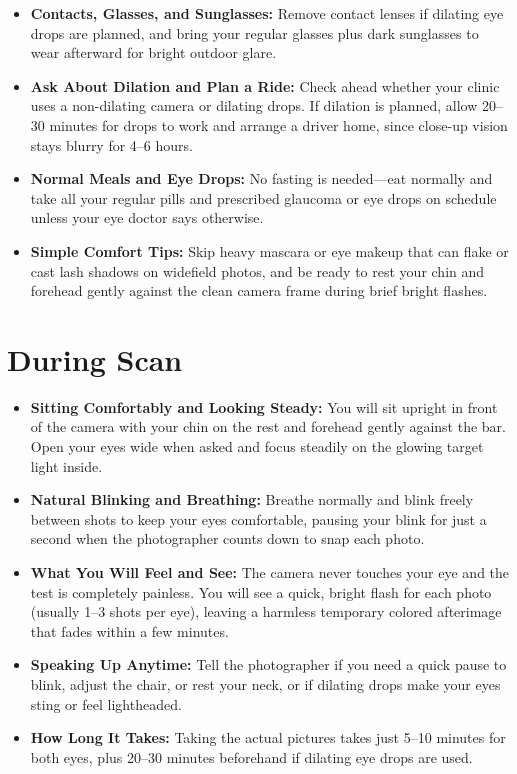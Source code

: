 \begin{itemize}
    \item \textbf{Contacts, Glasses, and Sunglasses:} Remove contact lenses if dilating eye drops are planned, and bring your regular glasses plus dark sunglasses to wear afterward for bright outdoor glare.
    \item \textbf{Ask About Dilation and Plan a Ride:} Check ahead whether your clinic uses a non-dilating camera or dilating drops. If dilation is planned, allow 20--30 minutes for drops to work and arrange a driver home, since close-up vision stays blurry for 4--6 hours.
    \item \textbf{Normal Meals and Eye Drops:} No fasting is needed---eat normally and take all your regular pills and prescribed glaucoma or eye drops on schedule unless your eye doctor says otherwise.
    \item \textbf{Simple Comfort Tips:} Skip heavy mascara or eye makeup that can flake or cast lash shadows on widefield photos, and be ready to rest your chin and forehead gently against the clean camera frame during brief bright flashes.
\end{itemize}

\section{During Scan}

\begin{itemize}
    \item \textbf{Sitting Comfortably and Looking Steady:} You will sit upright in front of the camera with your chin on the rest and forehead gently against the bar. Open your eyes wide when asked and focus steadily on the glowing target light inside.
    \item \textbf{Natural Blinking and Breathing:} Breathe normally and blink freely between shots to keep your eyes comfortable, pausing your blink for just a second when the photographer counts down to snap each photo.
    \item \textbf{What You Will Feel and See:} The camera never touches your eye and the test is completely painless. You will see a quick, bright flash for each photo (usually 1--3 shots per eye), leaving a harmless temporary colored afterimage that fades within a few minutes.
    \item \textbf{Speaking Up Anytime:} Tell the photographer if you need a quick pause to blink, adjust the chair, or rest your neck, or if dilating drops make your eyes sting or feel lightheaded.
    \item \textbf{How Long It Takes:} Taking the actual pictures takes just 5--10 minutes for both eyes, plus 20--30 minutes beforehand if dilating eye drops are used.
\end{itemize}

